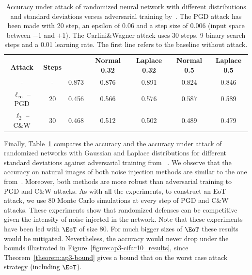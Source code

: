 \begin{table}[t]
  \caption{Accuracy under attack of randomized neural network with different distributions and standard deviations versus adversarial training by~\citet{madry2018towards}. The PGD attack has been made with 20 step, an epsilon of 0.06 and a step size of 0.006 (input space between $-1$ and $+1$). The Carlini\&Wagner attack uses 30 steps, 9 binary search steps and a 0.01 learning rate. The first line refers to the baseline without attack.}
  \label{Results}
  \centering
  \begin{tabular}{ccccccc}
    \toprule
      & & \multirow{2}[0]{*}{\citet{madry2018towards}} & \multirow{2}[0]{*}{\textbf{Normal 0.32}} & \multirow{2}[0]{*}{\textbf{Laplace 0.32}} & \multirow{2}[0]{*}{\textbf{Normal 0.5}} & \multirow{2}[0]{*}{\textbf{Laplace 0.5}} \\
     \textbf{Attack} & \textbf{Steps} & & & \\
    \midrule
    -  & - & 0.873 & 0.876 & 0.891 & 0.824 & 0.846 \\ 
    $\ell_\infty$ -- PGD & 20 & 0.456 & 0.566 & 0.576 & 0.587 & 0.589 \\
    $\ell_2$ -- C\&W & 30 & 0.468 & 0.512 & 0.502 & 0.489 & 0.479 \\
    \bottomrule
  \end{tabular}
  \label{table:madry_vs_random}
\end{table}

Finally, Table~\ref{table:madry_vs_random} compares the accuracy and the accuracy under attack of randomized networks with Gaussian and Laplace distributions for different standard deviations against adversarial training from ~\citet{madry2018towards}.
We observe that the accuracy on natural images of both noise injection methods are similar to the one from~\cite{madry2018towards}.
Moreover, both methods are more robust than adversarial training to PGD and C\&W attacks.
As with all the experiments, to construct an EoT attack,  we use 80 Monte Carlo simulations at every step of PGD and C\&W attacks.
These experiments show that randomized defenses can be competitive given the intensity of noise injected in the network.
Note that these experiments have been led with $\EoT$ of size 80.
For much bigger sizes of $\EoT$ these results would be mitigated.
Nevertheless, the accuracy would never drop under the bounds illustrated in Figure~\ref{figure:ap3-cifar10_results}, since Theorem~\ref{theorem:ap3-bound} gives a bound that on the worst case attack strategy (including $\EoT$).

